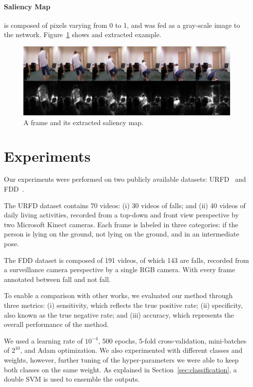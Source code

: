 \documentclass[conference]{IEEEtran}
\begin{document}
\paragraph{Saliency Map} is composed of pixels varying from 0 to 1, and was fed as a gray-scale image to the network. Figure~\ref{fig:sal} shows and extracted example.

\begin{figure}[!htb]
\centerline{\includegraphics[width=\linewidth]{figures/sal.png}}
\caption{A frame and its extracted saliency map.}
\label{fig:sal}
\end{figure}

\section{Experiments}
\label{sec:experiments}

Our experiments were performed on two publicly available datasets: URFD~\cite{kwolek2014human} and FDD~\cite{charfi2013optimised}.

The URFD dataset contains 70 videos: (i) 30 videos of falls; and (ii) 40 videos of daily living activities, recorded from a top-down and front view perspective by two Microsoft Kinect cameras. Each frame is labeled in three categories: if the person is lying on the ground, not lying on the ground, and in an intermediate pose.

The FDD dataset is composed of 191 videos, of which 143 are falls, recorded from a surveillance camera perspective by a single RGB camera. With every frame annotated between fall and not fall.

To enable a comparison with other works, we evaluated our method through three metrics: (i) sensitivity, which reflects the true positive rate; (ii) specificity, also known as the true negative rate; and (iii) accuracy, which represents the overall performance of the method. 

We used a learning rate of $10^{-4}$, 500 epochs, 5-fold cross-validation, mini-batches of $2^{10}$, and Adam optimization. We also experimented with different classes and weights, however, further tuning of the hyper-parameters we were able to keep both classes on the same weight. As explained in Section~\ref{sec:classification}, a double SVM is used to ensemble the outputs.
\end{document}
